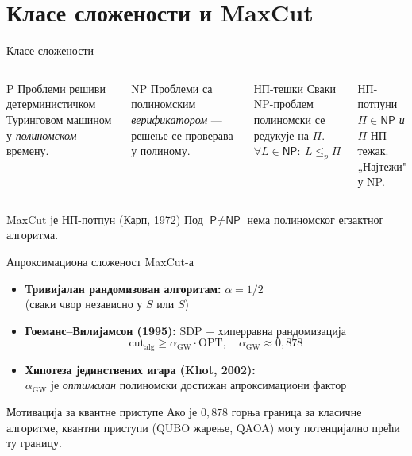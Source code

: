 \documentclass[aspectratio=169]{beamer}
\begin{document}
\section{Класе сложености и MaxCut}

\begin{frame}{Класе сложености}
  \begin{columns}[T]
      \begin{block}{\textsf{P}}
        Проблеми решиви детерминистичком Туринговом машином у \emph{полиномском} времену.
      \end{block}
      \medskip
      \begin{block}{\textsf{NP}}
        Проблеми са полиномским \emph{верификатором} — решење се проверава у полиному.
      \end{block}
      \begin{block}{НП-тешки}
        Сваки NP-проблем полиномски се редукује на $\Pi$.\\
        \medskip
        $\forall L \in \textsf{NP}:\ L \leq_p \Pi$
      \end{block}
      \medskip
      \begin{block}{НП-потпуни}
        $\Pi \in \textsf{NP}$ \emph{и} $\Pi$ НП-тежак.\\
        „Најтежи" у \textsf{NP}.
      \end{block}
  \end{columns}

  \bigskip
  \begin{alertblock}{MaxCut је НП-потпун (Карп, 1972)}
    Под $\textsf{P} \neq \textsf{NP}$ нема полиномског егзактног алгоритма.
  \end{alertblock}
\end{frame}

\begin{frame}{Апроксимациона сложеност MaxCut-а}
  \begin{itemize}
    \item \textbf{Тривијалан рандомизован алгоритам:} $\alpha = 1/2$\\
          (сваки чвор независно у $S$ или $\bar S$)
    \bigskip
    \item \textbf{Гоеманс–Вилијамсон (1995):} SDP + хиперравна рандомизација
          \[
            \mathrm{cut}_{\mathrm{alg}} \geq \alpha_{\mathrm{GW}} \cdot \mathrm{OPT},
            \quad \alpha_{\mathrm{GW}} \approx 0{,}878
          \]
    \bigskip
    \item \textbf{Хипотеза јединствених игара (Khot, 2002):}\\
          $\alpha_{\mathrm{GW}}$ је \emph{оптималан} полиномски достижан апроксимациони фактор
  \end{itemize}

  \begin{block}{Мотивација за квантне приступе}
    Ако је $0{,}878$ горња граница за класичне алгоритме, квантни приступи
    (QUBO жарење, QAOA) могу потенцијално прећи ту границу.
  \end{block}
\end{frame}
\end{document}

